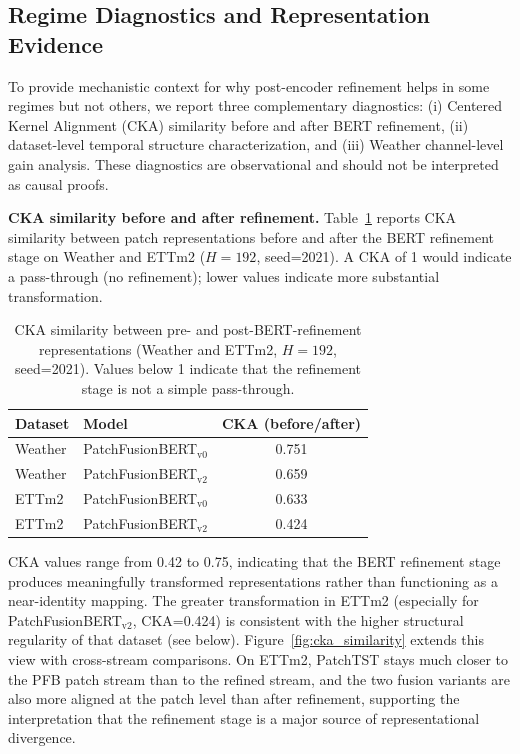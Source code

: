 \documentclass{ieeeaccess}
\newcommand{\modelvzero}{PatchFusionBERT$_{\text{v0}}$\xspace}
\newcommand{\modelvtwo}{PatchFusionBERT$_{\text{v2}}$\xspace}
\begin{document}
\subsection{Regime Diagnostics and Representation Evidence}
\label{sec:diagnostics}
To provide mechanistic context for why post-encoder refinement helps in some regimes
but not others, we report three complementary diagnostics: (i) Centered Kernel
Alignment (CKA) similarity before and after BERT refinement, (ii) dataset-level
temporal structure characterization, and (iii) Weather channel-level gain analysis.
These diagnostics are observational and should not be interpreted as causal proofs.

\textbf{CKA similarity before and after refinement.}
Table~\ref{tab:cka} reports CKA similarity between patch representations before and
after the BERT refinement stage on Weather and ETTm2 ($H=192$, seed=2021). A CKA
of 1 would indicate a pass-through (no refinement); lower values indicate more
substantial transformation.

\begin{table}[t]
\centering
\caption{CKA similarity between pre- and post-BERT-refinement representations
(Weather and ETTm2, $H=192$, seed=2021). Values below 1 indicate that the
refinement stage is not a simple pass-through.}
\label{tab:cka}
\small
\begin{tabular}{@{}llc@{}}
\toprule
Dataset & Model & CKA (before/after) \\
\midrule
Weather & \modelvzero & 0.751 \\
Weather & \modelvtwo  & 0.659 \\
ETTm2   & \modelvzero & 0.633 \\
ETTm2   & \modelvtwo  & 0.424 \\
\bottomrule
\end{tabular}
\end{table}

CKA values range from 0.42 to 0.75, indicating that the BERT refinement stage
produces meaningfully transformed representations rather than functioning as a
near-identity mapping. The greater transformation in ETTm2 (especially for
\modelvtwo, CKA=0.424) is consistent with the higher structural regularity of that
dataset (see below). Figure~\ref{fig:cka_similarity} extends this view with
cross-stream comparisons. On ETTm2, PatchTST stays much closer to the PFB patch
stream than to the refined stream, and the two fusion variants are also more aligned
at the patch level than after refinement, supporting the interpretation that the
refinement stage is a major source of representational divergence.
\end{document}
